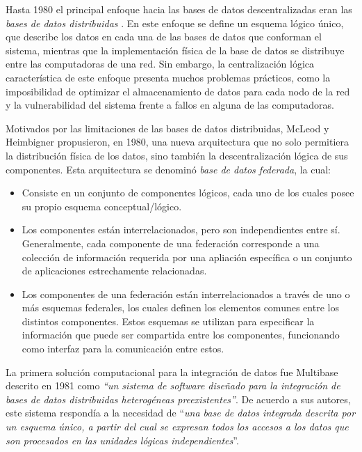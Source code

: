 Hasta 1980 el principal enfoque hacia las bases de datos descentralizadas eran las
\textit{bases de datos distribuidas} \cite{mcleod1980federated}. En este enfoque se define un esquema lógico
único, que describe los datos en cada una de las bases de datos que conforman el sistema, mientras que la implementación
física de la base de datos se distribuye entre las computadoras de una red. Sin embargo,
la centralización lógica característica de este enfoque presenta muchos problemas prácticos, como la
imposibilidad de optimizar el almacenamiento de datos para cada nodo de la red y la vulnerabilidad del sistema frente a fallos en alguna de las computadoras.


Motivados por las limitaciones de las bases de datos distribuidas, McLeod y Heimbigner \cite{mcleod1980federated} propusieron, en 1980, una nueva
arquitectura que no solo permitiera la distribución física de los datos, sino también
la descentralización lógica de sus componentes. Esta arquitectura se denominó \textit{base de datos federada}, la cual:

\begin{itemize}
    \item Consiste en un conjunto de componentes lógicos, cada uno de los cuales posee su propio esquema conceptual/lógico.
    \item Los componentes están interrelacionados, pero son independientes entre sí. Generalmente, cada componente de una federación
    corresponde a una colección de información requerida por una apliación específica o un conjunto de aplicaciones
    estrechamente relacionadas.
    \item Los componentes de una federación están interrelacionados a través de uno o más esquemas federales, los cuales definen 
    los elementos comunes entre los distintos componentes. Estos esquemas se utilizan para especificar la información  que puede ser compartida
    entre los componentes, funcionando como interfaz para la comunicación entre estos.
\end{itemize}

La primera solución computacional para la integración de datos fue Multibase \cite{smith1981multibase} descrito en 1981 como \textit{``un sistema de software
diseñado para la integración de bases de datos distribuidas heterogéneas preexistentes''}. De acuerdo a sus autores, este sistema respondía a la necesidad
de ``\textit{una base de datos integrada descrita por un esquema único, a partir del cual se expresan todos los accesos a los datos que son
procesados en las unidades lógicas independientes}''.

